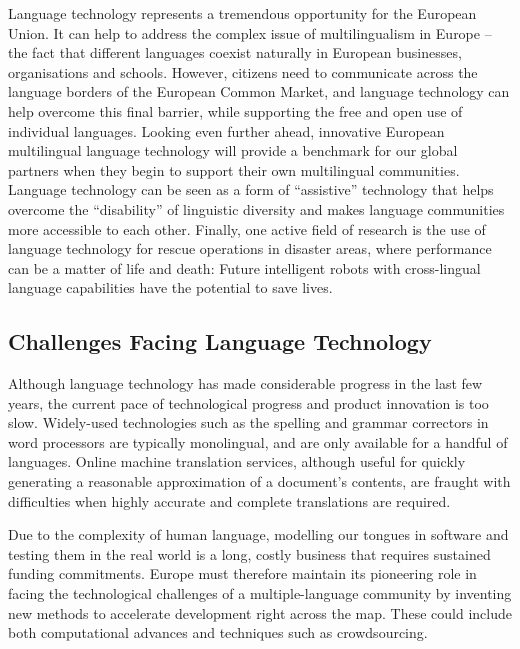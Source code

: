 \begin{multicols}{2}
Language technology represents a tremendous opportunity for the European Union. It can help to address the complex issue of multilingualism in Europe – the fact that different languages coexist naturally in European businesses, organisations and schools. However, citizens need to communicate across the language borders of the European Common Market, and language technology can help overcome this final barrier, while supporting the free and open use of individual languages. Looking even further ahead, innovative European multilingual language technology will provide a benchmark for our global partners when they begin to support their own multilingual communities. Language technology can be seen as a form of “assistive” technology that helps overcome the “disability” of linguistic diversity and makes language communities more accessible to each other. Finally, one active field of research is the use of language technology for rescue operations in disaster areas, where performance can be a matter of life and death: Future intelligent robots with cross-lingual language capabilities have the potential to save lives.

\subsection{Challenges Facing Language Technology}

Although language technology has made considerable progress in the last few years, the current pace of technological progress and product innovation is too slow. Widely-used technologies such as the spelling and grammar correctors in word processors are typically monolingual, and are only available for a handful of languages. Online machine translation services, although useful for quickly generating a reasonable approximation of a document’s contents, are fraught with difficulties when highly accurate and complete translations are required. 


Due to the complexity of human language, modelling our tongues in software and testing them in the real world is a long, costly business that requires sustained funding commitments. Europe must therefore maintain its pioneering role in facing the technological challenges of a multiple-language community by inventing new methods to accelerate development right across the map. These could include both computational advances and techniques such as crowdsourcing.


\end{multicols}
